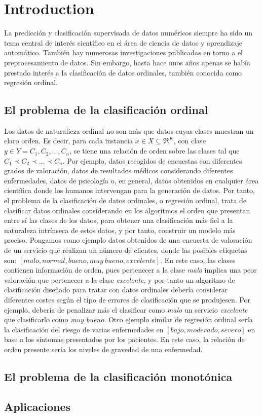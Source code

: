 \chapter{Introduction}
\label{introduction}

La predicción y clasificación supervisada de datos numéricos siempre ha sido un tema central de interés científico en el área de ciencia de datos y aprendizaje automático. También hay numerosas investigaciones publicadas en torno a el preprocesamiento de datos. Sin embargo, hasta hace unos años apenas se había prestado interés a la clasificación de datos ordinales, también conocida como regresión ordinal.

\section{El problema de la clasificación ordinal}
Los datos de naturalieza ordinal no son más que datos cuyas clases muestran un claro orden. Es decir, para cada instancia $x \in X \subseteq \Re^K $, con clase $y\in Y={C_1,C_2,...,C_n}$, se tiene una relación de orden sobre las clases tal que $C_1 \prec C_2 \prec ... \prec C_n$. Por ejemplo, datos recogidos de encuestas con diferentes grados de valoración, datos de resultados médicos considerando diferentes enfermedades, datos de psicología o, en general, datos obtenidos en cualquier área científica donde los humanos intervengan para la generación de datos. \newline
Por tanto, el problema de la clasificación de datos ordinales, o regresión ordinal, trata de clasificar datos ordinales considerando en los algoritmos el orden que presentan entre sí las clases de los datos, para obtener una clasificación más fiel a la naturaleza intrínseca de estos datos, y por tanto, construir un modelo más preciso. Pongamos como ejemplo datos obtenidos de una encuesta de valoración de un servicio que realizan un número de clientes, donde las posibles etiquetas son: \textit{$\left[malo, normal, bueno, muy\ bueno, excelente\right]$}. En este caso, las clases contienen información de orden, pues pertenecer a la clase \textit{malo} implica una peor valoración que pertenecer a la clase \textit{excelente}, y por tanto un algoritmo de clasificación diseñado para tratar con datos ordinales debería considerar diferentes costes según el tipo de errores de clasificación que se produjesen. Por ejemplo, debería de penalizar más el clasificar como \textit{malo} un servicio \textit{excelente} que clasificarlo como \textit{muy bueno}. Otro ejemplo similar de regresión ordinal sería la clasificación del riesgo de varias enfermedades en \textit{$\left[bajo, moderado, severo\right]$} en base a los síntomas presentados por los pacientes. En este caso, la relación de orden presente sería los niveles de gravedad de una enfermedad. \newline

\section{El problema de la clasificación monotónica}

\section{Aplicaciones}